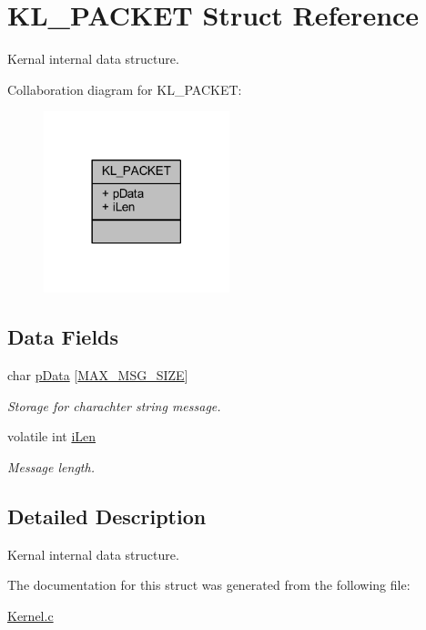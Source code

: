 \hypertarget{struct_k_l___p_a_c_k_e_t}{}\section{K\+L\+\_\+\+P\+A\+C\+K\+ET Struct Reference}
\label{struct_k_l___p_a_c_k_e_t}


Kernal internal data structure.  




Collaboration diagram for K\+L\+\_\+\+P\+A\+C\+K\+ET\+:
\nopagebreak
\begin{figure}[H]
\begin{center}
\leavevmode
\includegraphics[width=153pt]{struct_k_l___p_a_c_k_e_t__coll__graph}
\end{center}
\end{figure}
\subsection*{Data Fields}
\begin{DoxyCompactItemize}
\item 
\mbox{\label{struct_k_l___p_a_c_k_e_t_a4bd0c15b86a62771c26a2364683d7192}} 
char \hyperlink{struct_k_l___p_a_c_k_e_t_a4bd0c15b86a62771c26a2364683d7192}{p\+Data} \mbox{[}\hyperlink{_kernel_8c_af176e32c7a1ac429d45241dbcda652f9}{M\+A\+X\+\_\+\+M\+S\+G\+\_\+\+S\+I\+ZE}\mbox{]}
\begin{DoxyCompactList}\small\item\em Storage for charachter string message. \end{DoxyCompactList}\item 
\mbox{\label{struct_k_l___p_a_c_k_e_t_a55ef7c6f306bac934811fad4a60756c5}} 
volatile int \hyperlink{struct_k_l___p_a_c_k_e_t_a55ef7c6f306bac934811fad4a60756c5}{i\+Len}
\begin{DoxyCompactList}\small\item\em Message length. \end{DoxyCompactList}\end{DoxyCompactItemize}


\subsection{Detailed Description}
Kernal internal data structure. 

The documentation for this struct was generated from the following file\+:\begin{DoxyCompactItemize}
\item 
\hyperlink{_kernel_8c}{Kernel.\+c}\end{DoxyCompactItemize}
